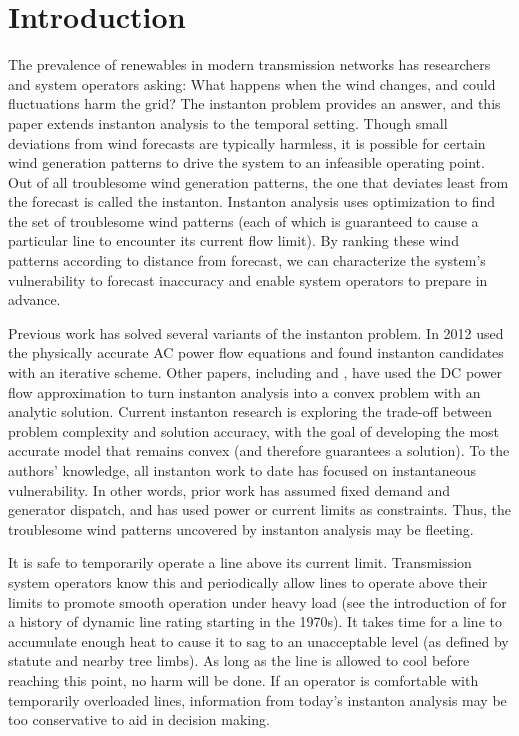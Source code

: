 \documentclass[conference]{IEEEtran}
\begin{document}
\section{Introduction}

The prevalence of renewables in modern transmission networks has researchers and system operators asking: What happens when the wind changes, and could fluctuations harm the grid? The instanton problem provides an answer, and this paper extends instanton analysis to the temporal setting. Though small deviations from wind forecasts are typically harmless, it is possible for certain wind generation patterns to drive the system to an infeasible operating point. Out of all troublesome wind generation patterns, the one that deviates least from the forecast is called the instanton. Instanton analysis uses optimization to find the set of troublesome wind patterns (each of which is guaranteed to cause a particular line to encounter its current flow limit). By ranking these wind patterns according to distance from forecast, we can characterize the system's vulnerability to forecast inaccuracy and enable system operators to prepare in advance.

Previous work has solved several variants of the instanton problem. In 2012 \cite{baghsorkhi2012} used the physically accurate AC power flow equations and found instanton candidates with an iterative scheme. Other papers, including \cite{chertkov2011} and \cite{chertkov2011a}, have used the DC power flow approximation to turn instanton analysis into a convex problem with an analytic solution. Current instanton research is exploring the trade-off between problem complexity and solution accuracy, with the goal of developing the most accurate model that remains convex (and therefore guarantees a solution). To the authors' knowledge, all instanton work to date has focused on instantaneous vulnerability. In other words, prior work has assumed fixed demand and generator dispatch, and has used power or current limits as constraints. Thus, the troublesome wind patterns uncovered by instanton analysis may be fleeting.

It is safe to temporarily operate a line above its current limit. Transmission system operators know this and periodically allow lines to operate above their limits to promote smooth operation under heavy load (see the introduction of \cite{banakar2005} for a history of dynamic line rating starting in the 1970s). It takes time for a line to accumulate enough heat to cause it to sag to an unacceptable level (as defined by statute and nearby tree limbs). As long as the line is allowed to cool before reaching this point, no harm will be done. If an operator is comfortable with temporarily overloaded lines, information from today's instanton analysis may be too conservative to aid in decision making.
\end{document}
